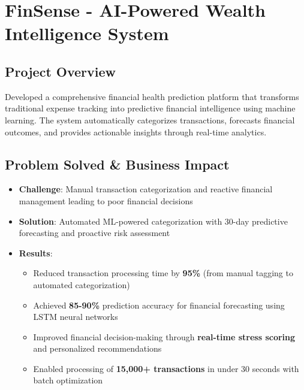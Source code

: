 \documentclass[11pt]{article}
\begin{document}
\section*{FinSense - AI-Powered Wealth Intelligence System}

\subsection*{Project Overview}
Developed a comprehensive financial health prediction platform that transforms traditional expense tracking into predictive financial intelligence using machine learning. The system automatically categorizes transactions, forecasts financial outcomes, and provides actionable insights through real-time analytics.

\subsection*{Problem Solved \& Business Impact}
\begin{itemize}[leftmargin=*]
    \item \textbf{Challenge}: Manual transaction categorization and reactive financial management leading to poor financial decisions
    \item \textbf{Solution}: Automated ML-powered categorization with 30-day predictive forecasting and proactive risk assessment
    \item \textbf{Results}: 
        \begin{itemize}
            \item Reduced transaction processing time by \textbf{95\%} (from manual tagging to automated categorization)
            \item Achieved \textbf{85-90\%} prediction accuracy for financial forecasting using LSTM neural networks
            \item Improved financial decision-making through \textbf{real-time stress scoring} and personalized recommendations
            \item Enabled processing of \textbf{15,000+ transactions} in under 30 seconds with batch optimization
        \end{itemize}
\end{itemize}
\end{document}
